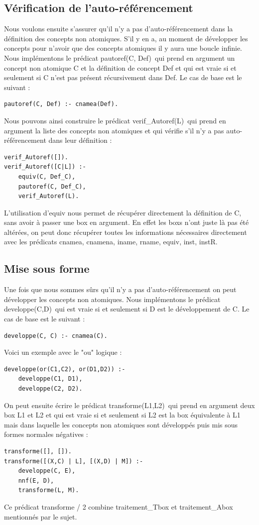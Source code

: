 \documentclass{article}
\begin{document}
\subsection{Vérification de l'auto-référencement}
Nous voulons ensuite s'assurer qu'il n'y a pas d'auto-référencement dans la définition des concepts non atomiques. S'il y en a, au moment de développer les concepts pour n'avoir que des concepts atomiques il y aura une boucle infinie. Nous implémentons le prédicat \color{blue}pautoref(C, Def)\color{black}\ qui prend en argument un concept non atomique C et la définition de concept Def et qui est vraie si et seulement si C n'est pas présent récursivement dans Def. Le cas de base est le suivant :
\begin{verbatim}
pautoref(C, Def) :- cnamea(Def).
\end{verbatim}

Nous pouvons ainsi construire le prédicat \color{blue}verif\_Autoref(L)\color{black}\ qui prend en argument la liste des concepts non atomiques et qui vérifie s'il n'y a pas auto-référencement dans leur définition : 
\begin{verbatim}
verif_Autoref([]).
verif_Autoref([C|L]) :-
	equiv(C, Def_C),
	pautoref(C, Def_C),
	verif_Autoref(L).
\end{verbatim}
L'utilisation d'equiv nous permet de récupérer directement la définition de C, sans avoir à passer une box en argument. En effet les boxs n'ont juste là pas été altérées, on peut donc récupérer toutes les informations nécessaires directement avec les prédicats  \color{blue}cnamea, cnamena, iname, rname, equiv, inst, instR\color{black}.

\subsection{Mise sous forme}
Une fois que nous sommes sûrs qu'il n'y a pas d'auto-référencement on peut développer les concepts non atomiques. Nous implémentons le prédicat \color{blue}developpe(C,D)\color{black}\ qui est vraie si et seulement si D est le développement de C. Le cas de base est le suivant : 
\begin{verbatim}
developpe(C, C) :- cnamea(C).
\end{verbatim}
Voici un exemple avec le "ou" logique :
\begin{verbatim}
developpe(or(C1,C2), or(D1,D2)) :- 
	developpe(C1, D1), 
	developpe(C2, D2).
 \end{verbatim}
On peut ensuite écrire le prédicat \color{blue}transforme(L1,L2)\color{black}\ qui prend en argument deux box L1 et L2 et qui est vraie si et seulement si L2 est la box équivalente à L1 mais dans laquelle les concepts non atomiques sont développés puis mis sous formes normales négatives :
\begin{verbatim}
transforme([], []).
transforme([(X,C) | L], [(X,D) | M]) :- 
	developpe(C, E),
	nnf(E, D),
	transforme(L, M).
\end{verbatim}
Ce prédicat \color{blue} transforme / 2 \color{black} combine \color{blue} traitement\_Tbox \color{black} et \color{blue} traitement\_Abox \color{black} mentionnés par le sujet.
\end{document}

